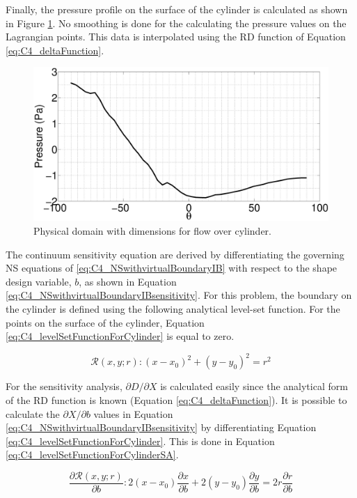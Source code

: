 Finally, the pressure profile on the surface of the cylinder is calculated as shown in Figure \ref{fig:C4_pressureOnSurfaceCylinder}. No smoothing is done for the calculating the pressure values on the Lagrangian points. This data is interpolated using the RD function of Equation \eqref{eq:C4_deltaFunction}.

\begin{figure}[H]
    \centering
    \includegraphics[width=12.00cm]{Chapter_4/figure/flow_over_cylinder/p_on_boundary_RE100.eps}
    \caption{Physical domain with dimensions for flow over cylinder.}
    \label{fig:C4_pressureOnSurfaceCylinder}
\end{figure}

The continuum sensitivity equation are derived by differentiating the governing NS equations of \eqref{eq:C4_NSwithvirtualBoundaryIB} with respect to the shape design variable, $b$, as shown in Equation \eqref{eq:C4_NSwithvirtualBoundaryIBsensitivity}. For this problem, the boundary on the cylinder is defined using the following analytical level-set function. For the points on the surface of the cylinder, Equation \eqref{eq:C4_levelSetFunctionForCylinder} is equal to zero.

\begin{equation}\label{eq:C4_levelSetFunctionForCylinder}
	\mathcal{R}(x, y; r): (x - x_0)^2 + (y - y_0)^2 = r^2
\end{equation}

For the sensitivity analysis, $\partial D/\partial X$ is calculated easily since the analytical form of the RD function is known (Equation \eqref{eq:C4_deltaFunction}). It is possible to calculate the $\partial X/\partial b$ values in Equation \eqref{eq:C4_NSwithvirtualBoundaryIBsensitivity} by differentiating Equation \eqref{eq:C4_levelSetFunctionForCylinder}. This is done in Equation \eqref{eq:C4_levelSetFunctionForCylinderSA}.

\begin{equation}\label{eq:C4_levelSetFunctionForCylinderSA}
	\frac{\partial \mathcal{R}(x, y; r)}{\partial b}: 
	2 (x - x_0)\dfrac{\partial x}{\partial b} + 
	2 (y - y_0)\frac{\partial y}{\partial b} = 
	2 r \frac{\partial r}{\partial b}
\end{equation}

